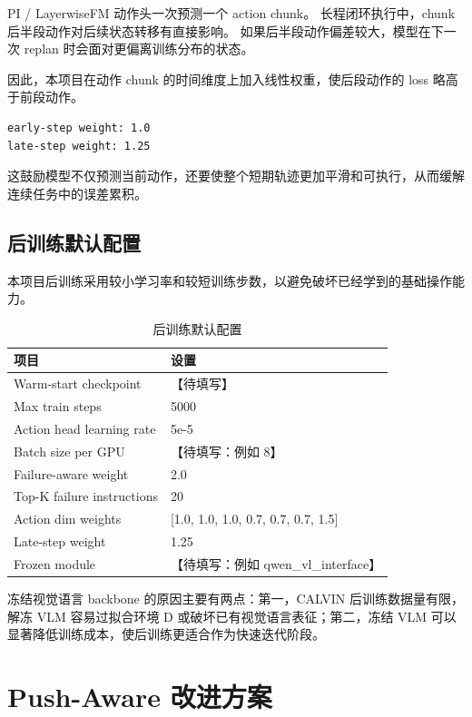 \documentclass[10pt,a4paper,fontset=none]{ctexart}
\newcommand{\todo}[1]{\textcolor{TodoRed}{【#1】}}
\newcommand{\PostTrainSteps}{5000}
\newcommand{\ActionLR}{5e-5}
\newcommand{\FailureAwareWeight}{2.0}
\newcommand{\FailureTopK}{20}
\begin{document}
PI / LayerwiseFM 动作头一次预测一个 action chunk。
长程闭环执行中，chunk 后半段动作对后续状态转移有直接影响。
如果后半段动作偏差较大，模型在下一次 replan 时会面对更偏离训练分布的状态。

因此，本项目在动作 chunk 的时间维度上加入线性权重，使后段动作的 loss 略高于前段动作。

\begin{lstlisting}[caption={动作 chunk 时间权重}]
early-step weight: 1.0
late-step weight: 1.25
\end{lstlisting}

这鼓励模型不仅预测当前动作，还要使整个短期轨迹更加平滑和可执行，从而缓解连续任务中的误差累积。

\subsection{后训练默认配置}

本项目后训练采用较小学习率和较短训练步数，以避免破坏已经学到的基础操作能力。

\begin{table}[H]
\centering
\caption{后训练默认配置}
\begin{tabularx}{0.86\textwidth}{lX}
\toprule
项目 & 设置 \\
\midrule
Warm-start checkpoint & \todo{待填写} \\
Max train steps & \PostTrainSteps{} \\
Action head learning rate & \ActionLR{} \\
Batch size per GPU & \todo{待填写：例如 8} \\
Failure-aware weight & \FailureAwareWeight{} \\
Top-K failure instructions & \FailureTopK{} \\
Action dim weights & [1.0, 1.0, 1.0, 0.7, 0.7, 0.7, 1.5] \\
Late-step weight & 1.25 \\
Frozen module & \todo{待填写：例如 qwen\_vl\_interface} \\
\bottomrule
\end{tabularx}
\end{table}

冻结视觉语言 backbone 的原因主要有两点：第一，CALVIN 后训练数据量有限，解冻 VLM 容易过拟合环境 D 或破坏已有视觉语言表征；第二，冻结 VLM 可以显著降低训练成本，使后训练更适合作为快速迭代阶段。

\section{Push-Aware 改进方案}
\end{document}
